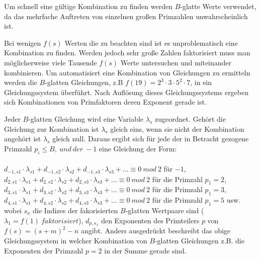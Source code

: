 \documentclass[a4paper,11pt]{article}
\begin{document}
Um schnell eine gültige Kombination zu finden werden $B$-glatte Werte verwendet, da
das mehrfache Auftreten von einzelnen großen Primzahlen unwahrscheinlich ist.

Bei wenigen $f(s)$ Werten die zu beachten sind ist es unproblematisch eine
Kombination zu finden. Werden jedoch sehr große Zahlen faktorisiert muss
man möglicherweise viele Tausende $f(s)$ Werte untersuchen und miteinander
kombinieren. Um automatisiert eine Kombination von Gleichungen zu ermitteln
werden die $B$-glatten Gleichungen, z.B $f(19) = 2^3\cdot3\cdot5^2\cdot7$,
in ein Gleichungssystem überführt. Nach Auflösung dieses Gleichungssystems
ergeben sich Kombinationen von Primfaktoren deren Exponent gerade ist.

Jeder $B$-glatten Gleichung wird eine Variable $\lambda_s$ zugeordnet. Gehört
die Gleichung zur Kombination ist $\lambda_s$ gleich eins, wenn sie nicht
der Kombination angehört ist $\lambda_s$ gleich null. Daraus ergibt sich
für jede der in Betracht gezogene Primzahl $p_i \leq B,\ und\ der\ -1 $ eine
Gleichung der Form:\\\\
$d_{-1,s1}\cdot\lambda_{s1}+d_{-1,s2}\cdot\lambda_{s2}+d_{-1,s3}\cdot\lambda_{s3}+...\equiv 0\ mod\ 2$ für $-1$,\\
$d_{2,s1}\cdot\lambda_{s1}+d_{2,s2}\cdot\lambda_{s2}+d_{2,s3}\cdot\lambda_{s3}+...\equiv 0\ mod\ 2$ für die Primzahl $p_1 = 2$,\\
$d_{3,s1}\cdot\lambda_{s1}+d_{3,s2}\cdot\lambda_{s2}+d_{3,s3}\cdot\lambda_{s3}+...\equiv 0\ mod\ 2$ für die Primzahl $p_1 = 3$,\\
$d_{4,s1}\cdot\lambda_{s1}+d_{4,s2}\cdot\lambda_{s2}+d_{4,s3}\cdot\lambda_{s3}+...\equiv 0\ mod\ 2$ für die Primzahl $p_1 = 5$ usw.\\
wobei $s_x$ die Indizes der fakorisierten $B$-glatten Wertpaare sind
($\lambda_1 = f(1)\ faktorisiert$), $d_{p,s_x}$ den Exponenten des
Primteilers $p$ von $f(s) = (s+m)^2-n$ angibt. Anders
ausgedrückt beschreibt das obige Gleichungssystem in welcher Kombination
von $B$-glatten Gleichungen z.B. die Exponenten der Primzahl $p=2$ in der
Summe gerade sind.\\\\
\end{document}
